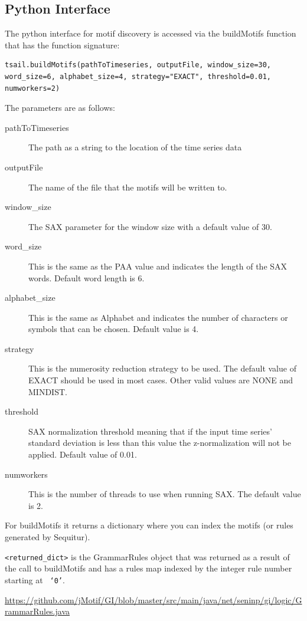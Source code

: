 \documentclass[letterpaper, 12pt]{article}
\def\bsq#1{%
	\lq{#1}\rq}
\begin{document}
\subsection{Python Interface}
The python interface for motif discovery is accessed via the buildMotifs function that has the function signature:
\begin{lstlisting}
tsail.buildMotifs(pathToTimeseries, outputFile, window_size=30, word_size=6, alphabet_size=4, strategy="EXACT", threshold=0.01, numworkers=2)
\end{lstlisting}

The parameters are as follows:
\begin{description}
	\item[pathToTimeseries] The path as a string to the location of the time series data
	\item[outputFile] The name of the file that the motifs will be written to.
	\item[window\_size] The SAX parameter for the window size with a default value of 30.
	\item[word\_size] This is the same as the PAA value and indicates the length of the SAX words.  Default word length is 6.
	\item[alphabet\_size] This is the same as Alphabet and indicates the number of characters or symbols that can be chosen.  Default value is 4.
	\item[strategy] This is the numerosity reduction strategy to be used.  The default value of EXACT should be used in most cases.  Other valid values are NONE and MINDIST.
	\item[threshold] SAX normalization threshold meaning that if the input time series' standard deviation is less than this value the z-normalization will not be applied. Default value of 0.01.
	\item[numworkers] This is the number of threads to use when running SAX.  The default value is 2.
\end{description}

For buildMotifs it returns a dictionary where you can index the motifs (or rules generated by Sequitur).

\texttt{<returned\_dict>} is the GrammarRules object that was returned as a result of the call to buildMotifs and has a rules map indexed by the integer rule number starting at \texttt{\bsq{0}}.

\small{\url{https://github.com/jMotif/GI/blob/master/src/main/java/net/seninp/gi/logic/GrammarRules.java}}
\end{document}
